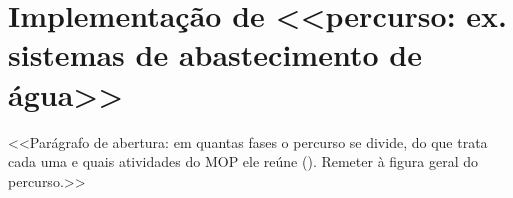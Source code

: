 %
%
%
\section{Implementação de <<percurso: ex. sistemas de abastecimento de água>>}
\label{sec:<<rotulo>>}

<<Parágrafo de abertura: em quantas fases o percurso se divide, do que
trata cada uma e quais atividades do MOP ele reúne ().
Remeter à figura geral do percurso.>>

